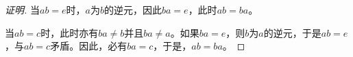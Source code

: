 \documentclass{article}
\begin{document}
\begin{CJK*}{UTF8}{gbsn}
\begin{proof}[证明]
当$ab=e$时，$a$为$b$的逆元，因此$ba=e$，此时$ab=ba$。

当$ab=c$时，此时亦有$ba\neq b$并且$ba\neq a$。如果$ba=e$，则$b$为$a$的逆元，于是$ab=e$，与$ab=c$矛盾。因此，必有$ba=c$，于是，$ab=ba$。






\end{proof}
\end{CJK*}
\end{document}

